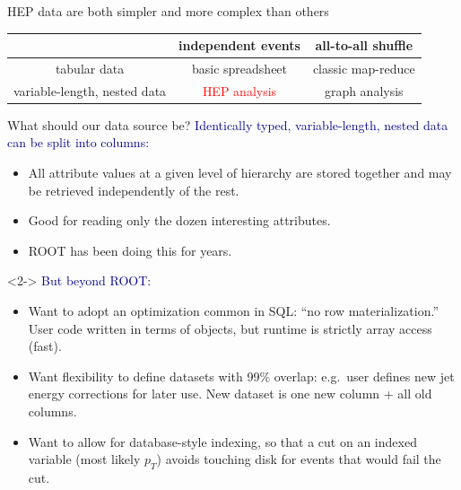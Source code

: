 \documentclass[aspectratio=169]{beamer}
\begin{document}
\begin{frame}{HEP data are both simpler and more complex than others}

\renewcommand{\arraystretch}{2}
\begin{center}
\begin{tabular}{c | c c}
                             & independent events & all-to-all shuffle \\\hline
tabular data                 & basic spreadsheet  & classic map-reduce \\
variable-length, nested data & \textcolor{red}{HEP analysis} & graph analysis \\
\end{tabular}
\end{center}
\end{frame}

\begin{frame}{What should our data source be?}
\vspace{0.5 cm}
\textcolor{darkblue}{Identically typed, variable-length, nested data can be split into columns:}
\begin{itemize}
\item All attribute values at a given level of hierarchy are stored together and may be retrieved independently of the rest.
\item Good for reading only the dozen interesting attributes.
\item ROOT has been doing this for years.
\end{itemize}

\begin{uncoverenv}<2->
\vspace{0.25 cm}
\textcolor{darkblue}{But beyond ROOT:}
\begin{itemize}
\item<2-> Want to adopt an optimization common in SQL: ``no row materialization.'' \\ User code written in terms of objects, but runtime is strictly array access (fast).
\item<3-> Want flexibility to define datasets with 99\% overlap: e.g.\ user defines new jet energy corrections for later use. New dataset is one new column + all old columns.
\item<4-> Want to allow for database-style indexing, so that a cut on an indexed variable (most likely $p_T$) avoids touching disk for events that would fail the cut.
\end{itemize}
\end{uncoverenv}
\end{frame}
\end{document}
